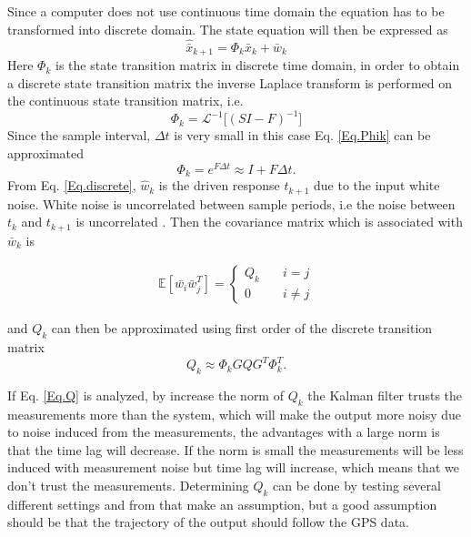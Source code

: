 Since a computer does not use continuous time domain the equation has to be transformed into discrete domain. The state equation will then be expressed as
\begin{equation}
\hat{\bar{x}}_{k+1} = \Phi_k \bar{x}_k +  \bar{w}_k	
\label{Eq.discrete}
\end{equation}
Here $\Phi_k$ is the state transition matrix in discrete time domain, in order to  obtain a discrete state transition matrix the inverse Laplace transform is performed on the continuous state transition matrix, i.e.
\begin{equation}
\Phi_k = \mathcal{L}^{-1}\big[(SI-F)^{-1}\big]
\label{Eq.Phik}
\end{equation}
Since the sample interval, $\Delta t$ is very small in this case Eq. \eqref{Eq.Phik} can be approximated 
\begin{equation}
\Phi_k = e^{F\Delta t} \approx I + F \Delta t 
\label{Eq.Final_Phik}.
\end{equation}
From Eq. \eqref{Eq.discrete}, $\hat{w}_k$ is the driven response $t_{k+1}$ due to the input white noise. White noise is uncorrelated between sample periods, i.e the noise between $t_k$ and $t_{k+1}$ is uncorrelated \cite{signal_process}. Then the covariance matrix which is associated with $\bar{w}_k$ is \cite{signal_process}

\begin{align}
\mathbb{E}[\bar{w_i}\bar{w}_j^T] =
\begin{cases}
  Q_k &\quad i=j\\    
  0 &\quad i\neq j   
\end{cases}
\end{align}

and $Q_k$ can then be approximated using first order of the discrete transition matrix \cite{Discrete_kalman}
\begin{equation}
Q_k\approx \Phi_k GQG^T \Phi_k^T.
\label{Eq.Q_k}
\end{equation}

If Eq. \eqref{Eq.Q} is analyzed, by increase the norm of $Q_k$ the Kalman filter trusts the measurements more than the system, which will make the output more noisy due to noise induced from the measurements, the advantages with a large norm is that the time lag will decrease. If the norm is small the measurements will be less induced with measurement noise but time lag will increase, which means that we don't trust the measurements. Determining $Q_k$ can be done by testing several different settings and from that make an assumption, but a good assumption should be that the trajectory of the output should follow the GPS data.\\



